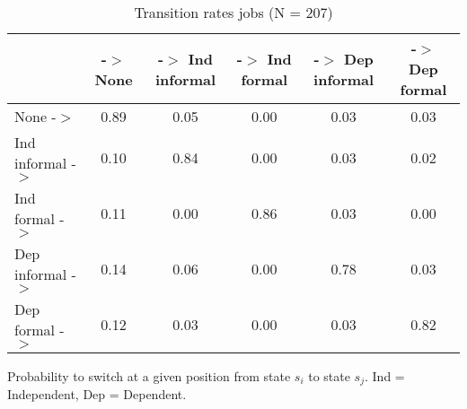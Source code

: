 \begin{table}[htp]
\footnotesize
\setlength{\tabcolsep}{10pt}
\renewcommand{\arraystretch}{1.3}
\begin{threeparttable}
\centering
\caption{Transition rates jobs (N = 207)} 
\label{tab:transition_rates_jobs}
\begin{tabular}{lccccc}
  \hline
 & -$>$ None & -$>$ Ind informal & -$>$ Ind formal & -$>$ Dep informal & -$>$ Dep formal \\ 
  \hline
None -$>$ & 0.89 & 0.05 & 0.00 & 0.03 & 0.03 \\ 
  Ind informal -$>$ & 0.10 & 0.84 & 0.00 & 0.03 & 0.02 \\ 
  Ind formal -$>$ & 0.11 & 0.00 & 0.86 & 0.03 & 0.00 \\ 
  Dep informal -$>$ & 0.14 & 0.06 & 0.00 & 0.78 & 0.03 \\ 
  Dep formal -$>$ & 0.12 & 0.03 & 0.00 & 0.03 & 0.82 \\ 
   \hline
\end{tabular}
\begin{tablenotes}
\scriptsize
\item Probability to switch at a given position from state $s_i$ to state $s_j$. Ind = Independent, Dep = Dependent.
\end{tablenotes}
\end{threeparttable}
\end{table}
